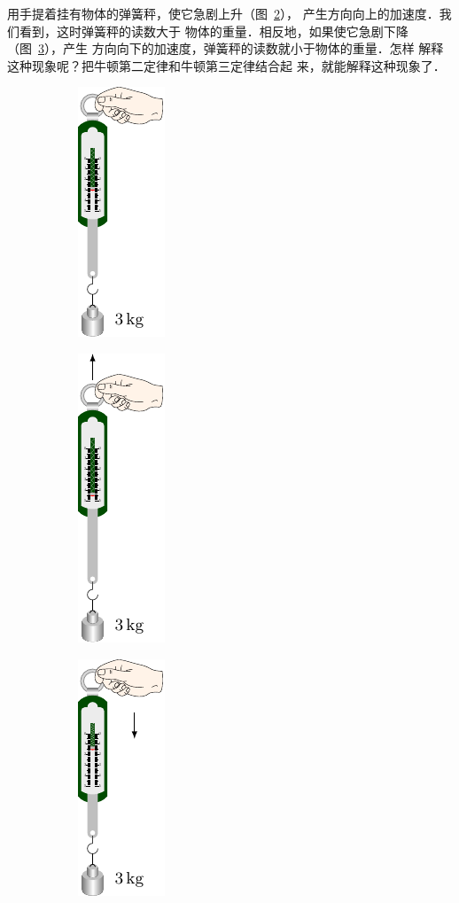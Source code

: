     用手提着挂有物体的弹簧秤，使它急剧上升（图~\ref{fig_A_3-12b}），
产生方向向上的加速度．我们看到，这时弹簧秤的读数大于
物体的重量．相反地，如果使它急剧下降（图~\ref{fig_A_3-12c}），产生
方向向下的加速度，弹簧秤的读数就小于物体的重量．怎样
解释这种现象呢？把牛顿第二定律和牛顿第三定律结合起
来，就能解释这种现象了．
\begin{figure}[htp]
    \centering
    \begin{subfigure} {0.3\linewidth} 
		\centering
		\includegraphics{fig/A/3-12a.pdf} 
		\caption{}\label{fig_A_3-12a} 
	\end{subfigure}
	\hfil
	\begin{subfigure} {0.3\linewidth} 
		\centering
		\includegraphics{fig/A/3-12b.pdf} 
		\caption{}\label{fig_A_3-12b} 
	\end{subfigure}
	\hfil
	\begin{subfigure} {0.3\linewidth} 
		\centering
		\includegraphics{fig/A/3-12c.pdf} 
		\caption{}\label{fig_A_3-12c} 
	\end{subfigure}
    \caption{}\label{fig_A_3-12}
\end{figure}

